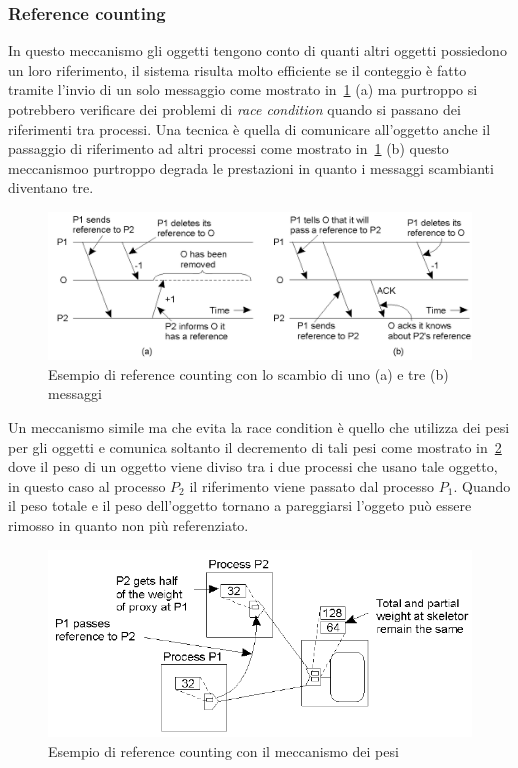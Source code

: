 \subsubsection{Reference counting}
In questo meccanismo gli oggetti tengono conto di quanti altri oggetti possiedono un loro riferimento, il sistema risulta molto efficiente se il conteggio è fatto tramite l'invio di un solo messaggio come mostrato in \figurename\,\ref{fig:referencecounting} (a) ma purtroppo si potrebbero verificare dei problemi di \emph{race condition} quando si passano dei riferimenti tra processi. Una tecnica è quella di comunicare all'oggetto anche il passaggio di riferimento ad altri processi come mostrato in \figurename\,\ref{fig:referencecounting} (b) questo meccanismoo purtroppo degrada le prestazioni in quanto i messaggi scambianti diventano tre.\\
\begin{figure}[htb]
\centering
\includegraphics[scale=0.4]{img/referencecounting.png}
\caption{Esempio di reference counting con lo scambio di uno (a) e tre (b) messaggi}\label{fig:referencecounting}
\end{figure}
Un meccanismo simile ma che evita la race condition è quello che utilizza dei pesi per gli oggetti e comunica soltanto il decremento di tali pesi come mostrato in \figurename\,\ref{fig:weight} dove il peso di un oggetto viene diviso tra i due processi che usano tale oggetto, in questo caso al processo $P_2$ il riferimento viene passato dal processo $P_1$. Quando il peso totale e il peso dell'oggetto tornano a pareggiarsi l'oggeto può essere rimosso in quanto non più referenziato. 
\begin{figure}[htb]
\centering
\includegraphics[scale=0.6]{img/weight.png}
\caption{Esempio di reference counting con il meccanismo dei pesi}\label{fig:weight}
\end{figure}
